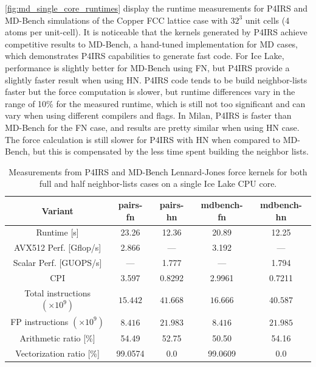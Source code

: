 \documentclass[preprint,12pt]{elsarticle}
\newcommand{\second}{\mbox{s}}
\newcommand{\seconds}{\mbox{s}}
\newcommand{\flop}{\mbox{flop}}
\newcommand{\GFS}{\mbox{G\flop/\second}}
\begin{document}
\autoref{fig:md_single_core_runtimes} display the runtime measurements for P4IRS and MD-Bench simulations of the Copper FCC lattice case with $32^{3}$ unit cells (4 atoms per unit-cell).
It is noticeable that the kernels generated by P4IRS achieve competitive results to MD-Bench, a hand-tuned implementation for MD cases, which demonstrates P4IRS capabilities to generate fast code.
For Ice Lake, performance is slightly better for MD-Bench using \ac{FN}, but P4IRS provide a slightly faster result when using \ac{HN}.
P4IRS code tends to be build neighbor-lists faster but the force computation is slower, but runtime differences vary in the range of 10\% for the measured runtime, which is still not too significant and can vary when using different compilers and flags.
In Milan, P4IRS is faster than MD-Bench for the \ac{FN} case, and results are pretty similar when using \ac{HN} case.
The force calculation is still slower for P4IRS with \ac{HN} when compared to MD-Bench, but this is compensated by the less time spent building the neighbor lists.

\begin{table}[htb]
    \centering
    \begin{tabular}{c|c|c|c|c}
        Variant & pairs-fn & pairs-hn & mdbench-fn & mdbench-hn \\
        \hline
        Runtime [\seconds] & 23.26 & 12.36 & 20.89 & 12.25 \\
        AVX512 Perf. [\GFS] & 2.866 & --- & 3.192 & --- \\
        Scalar Perf. [GUOPS/s] & --- & 1.777 & --- & 1.794 \\
        CPI & 3.597 & 0.8292 & 2.9961 & 0.7211 \\
        Total instructions $(\times 10^9)$ & $15.442$ & $41.668$ & $16.666$ & $40.587$ \\
        FP instructions $(\times 10^9)$ & $8.416$ & $21.983$ & $8.416$ & $21.985$ \\
        Arithmetic ratio [\%] & 54.49 & 52.75 & 50.50 & 54.16 \\
        Vectorization ratio [\%] & 99.0574 & 0.0 & 99.0609 & 0.0 \\
    \end{tabular}
    \caption{Measurements from P4IRS and MD-Bench Lennard-Jones force kernels for both full and half neighbor-lists cases on a single Ice Lake CPU core.}
    \label{tab:md_single_core_stats}
\end{table}
\end{document}
